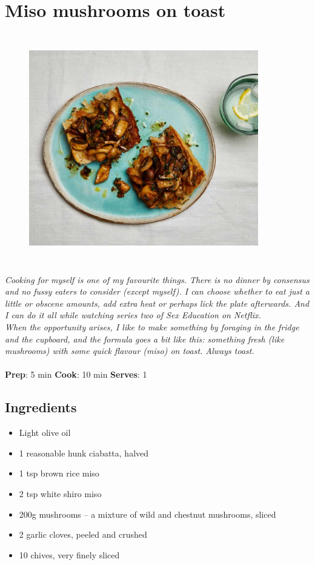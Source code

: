 \documentclass{book}
\begin{document}
\section{Miso mushrooms on toast}
\begin{figure}
\centering\includegraphics[width=10cm,height=10cm,keepaspectratio]{Recipe_Pictures/Miso_mushrooms_on_toast.png}
\end{figure}
\emph{Cooking for myself is one of my favourite things. There is no dinner by consensus and no fussy eaters to consider (except myself). I can choose whether to eat just a little or obscene amounts, add extra heat or perhaps lick the plate afterwards. And I can do it all while watching series two of Sex Education on Netflix.\\ 
When the opportunity arises, I like to make something by foraging in the fridge and the cupboard, and the formula goes a bit like this: something fresh (like mushrooms) with some quick flavour (miso) on toast. Always toast.}\\\\ 
\textbf{Prep}: 5 min
\textbf{Cook}: 10 min
\textbf{Serves}: 1
\subsection*{Ingredients}
\begin{itemize}
\item Light olive oil 
\item 1 reasonable hunk ciabatta, halved 
\item 1 tsp brown rice miso
\item 2 tsp white shiro miso 
\item 200g mushrooms – a mixture of wild and chestnut mushrooms, sliced
\item 2 garlic cloves, peeled and crushed 
\item 10 chives, very finely sliced
\end{itemize}
\end{document}
